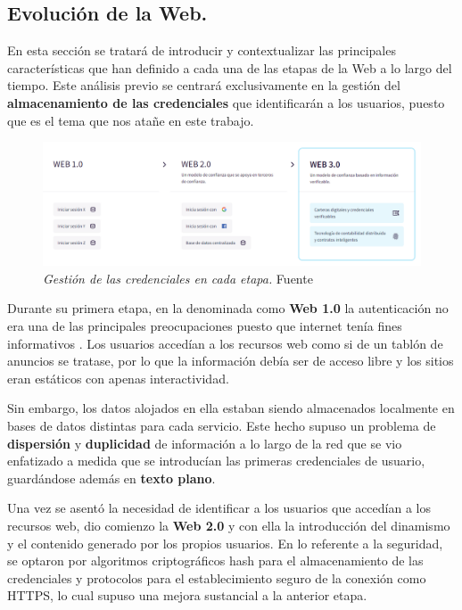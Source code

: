 \documentclass[../main.tex]{subfiles}
\begin{document}
\subsection{Evolución de la Web.}
En esta sección se tratará de introducir y contextualizar las principales características que han definido a cada una de las etapas de la Web a lo largo del tiempo. Este análisis previo se centrará exclusivamente en la gestión del \textbf{almacenamiento de las credenciales} que identificarán a los usuarios, puesto que es el tema que nos atañe en este trabajo.
\\

\begin{figure}[htbp]
    \centering
    \includegraphics[width=1\linewidth]{images/EvolucionWeb.png}
    \caption{\textit{Gestión de las credenciales en cada etapa.} Fuente \cite{ebsiVCF}}
    \label{fig:evolucion}
\end{figure}

Durante su primera etapa, en la denominada como \textbf{Web 1.0} la autenticación no era una de las principales preocupaciones puesto que internet tenía fines informativos \cite{WebAuthentication}. Los usuarios accedían a los recursos web como si de un tablón de anuncios se tratase, por lo que la información debía ser de acceso libre y los sitios eran estáticos con apenas interactividad.

Sin embargo, los datos alojados en ella estaban siendo almacenados localmente en bases de datos distintas para cada servicio. Este hecho supuso un problema de \textbf{dispersión} y \textbf{duplicidad} de información a lo largo de la red que se vio enfatizado a medida que se introducían las primeras credenciales de usuario, guardándose además en \textbf{texto plano}.

Una vez se asentó la necesidad de identificar a los usuarios que accedían a los recursos web, dio comienzo la \textbf{Web 2.0} y con ella la introducción del dinamismo y el contenido generado por los propios usuarios. En lo referente a la seguridad, se optaron por algoritmos criptográficos \Gls{hash} para el almacenamiento de las credenciales y protocolos para el establecimiento seguro de la conexión como \Gls{HTTPS}, lo cual supuso una mejora sustancial a la anterior etapa.
\end{document}
